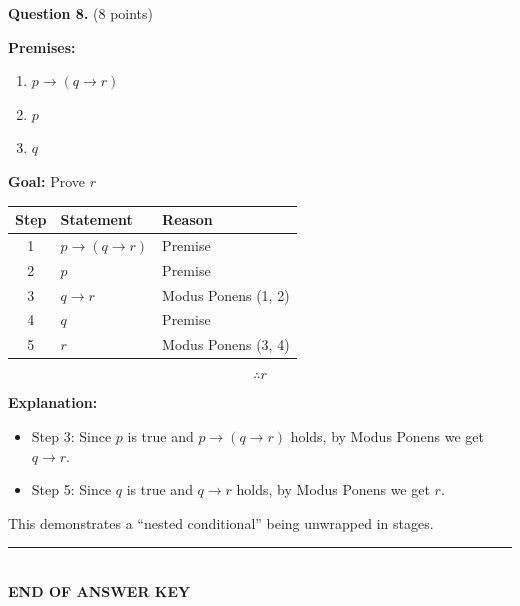 \documentclass[11pt,a4paper]{article}
\begin{document}
\vspace{15pt}

\textbf{Question 8.} (8 points)

\begin{solnbox}
\textbf{Premises:}
\begin{enumerate}[noitemsep]
    \item $p \to (q \to r)$
    \item $p$
    \item $q$
\end{enumerate}

\textbf{Goal:} Prove $r$

\begin{center}
\begin{tabular}{c|l|l}
\toprule
\textbf{Step} & \textbf{Statement} & \textbf{Reason} \\
\midrule
1 & $p \to (q \to r)$ & Premise \\
2 & $p$ & Premise \\
3 & $q \to r$ & Modus Ponens (1, 2) \\
4 & $q$ & Premise \\
5 & $r$ & Modus Ponens (3, 4) \\
\bottomrule
\end{tabular}
\end{center}

$$\boxed{\therefore r}$$

\textbf{Explanation:}
\begin{itemize}[noitemsep]
    \item Step 3: Since $p$ is true and $p \to (q \to r)$ holds, by Modus Ponens we get $q \to r$.
    \item Step 5: Since $q$ is true and $q \to r$ holds, by Modus Ponens we get $r$.
\end{itemize}

This demonstrates a ``nested conditional'' being unwrapped in stages.
\end{solnbox}

\vspace{20pt}

\begin{center}
\rule{0.5\textwidth}{0.5pt}\\[5pt]
\textbf{END OF ANSWER KEY}
\end{center}
\end{document}
